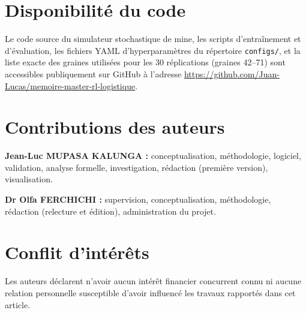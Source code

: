 \documentclass[11pt,a4paper]{article}
\begin{document}
\section*{Disponibilité du code}

Le code source du simulateur stochastique de mine, les scripts d'entraînement et d'évaluation, les fichiers YAML d'hyperparamètres du répertoire \texttt{configs/}, et la liste exacte des graines utilisées pour les 30 réplications (graines 42--71) sont accessibles publiquement sur GitHub à l'adresse \url{https://github.com/Juan-Lucas/memoire-master-rl-logistique}.

\section*{Contributions des auteurs}

\textbf{Jean-Luc MUPASA KALUNGA :} conceptualisation, méthodologie, logiciel, validation, analyse formelle, investigation, rédaction (première version), visualisation.

\textbf{Dr Olfa FERCHICHI :} supervision, conceptualisation, méthodologie, rédaction (relecture et édition), administration du projet.

\section*{Conflit d'intérêts}

Les auteurs déclarent n'avoir aucun intérêt financier concurrent connu ni aucune relation personnelle susceptible d'avoir influencé les travaux rapportés dans cet article.



\end{document}
